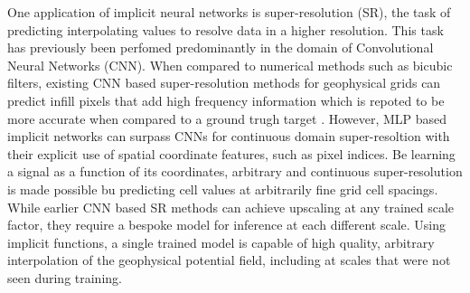 \documentclass{article}
\begin{document}
One application of implicit neural networks is super-resolution (SR), the task of predicting interpolating values to resolve data in a higher resolution.
This task has previously been perfomed predominantly in the domain of Convolutional Neural Networks (CNN).
When compared to numerical methods such as bicubic filters, existing CNN based super-resolution methods for geophysical grids can predict infill pixels that add high frequency information which is repoted to be more accurate when compared to a ground trugh target \parencite{smithMagneticGridResolution2022}.
However, MLP based implicit networks can surpass CNNs for continuous domain super-resoltion with their explicit use of spatial coordinate features, such as pixel indices.
Be learning a signal as a function of its coordinates, arbitrary and continuous super-resolution is made possible bu predicting cell values at arbitrarily fine grid cell spacings.
While earlier CNN based SR methods can achieve upscaling at any trained scale factor, they require a bespoke model for inference at each different scale.
Using implicit functions, a single trained model is capable of high quality, arbitrary interpolation of the geophysical potential field, including at scales that were not seen during training.
\end{document}
